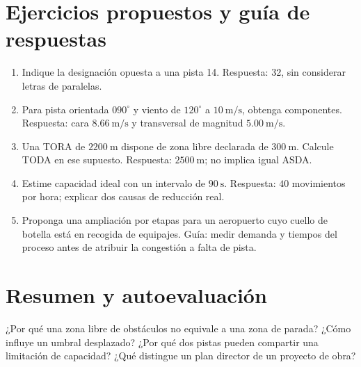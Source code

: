 \section{Ejercicios propuestos y guía de respuestas}
\begin{enumerate}
\item Indique la designación opuesta a una pista 14. Respuesta: 32, sin considerar letras de paralelas.
\item Para pista orientada $090^\circ$ y viento de $120^\circ$ a $10\ \mathrm{m/s}$, obtenga componentes. Respuesta: cara $8.66\ \mathrm{m/s}$ y transversal de magnitud $5.00\ \mathrm{m/s}$.
\item Una TORA de $2200\ \mathrm m$ dispone de zona libre declarada de $300\ \mathrm m$. Calcule TODA en ese supuesto. Respuesta: $2500\ \mathrm m$; no implica igual ASDA.
\item Estime capacidad ideal con un intervalo de $90\ \mathrm s$. Respuesta: $40$ movimientos por hora; explicar dos causas de reducción real.
\item Proponga una ampliación por etapas para un aeropuerto cuyo cuello de botella está en recogida de equipajes. Guía: medir demanda y tiempos del proceso antes de atribuir la congestión a falta de pista.
\end{enumerate}
\section{Resumen y autoevaluación}
¿Por qué una zona libre de obstáculos no equivale a una zona de parada? ¿Cómo influye un umbral desplazado? ¿Por qué dos pistas pueden compartir una limitación de capacidad? ¿Qué distingue un plan director de un proyecto de obra?


\studiumchaptercheck
